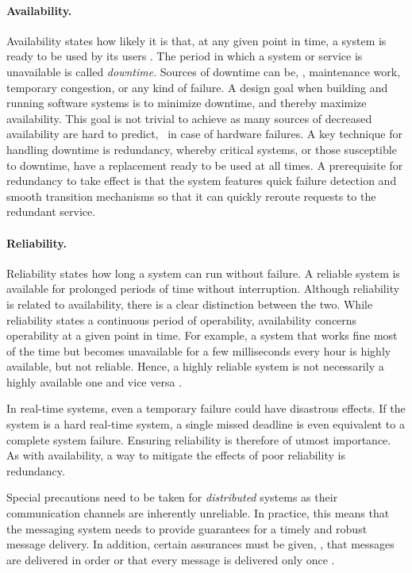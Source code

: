 \paragraph{Availability.}
Availability states how likely it is that, at any given point in time, a system is ready to be used by its users \cite{tanenbaum2017distributed}. The period in which a system or service is unavailable is called \emph{downtime}. Sources of downtime can be, \eg , maintenance work, temporary congestion, or any kind of failure. A design goal when building and running software systems is to minimize downtime, and thereby maximize availability. This goal is not trivial to achieve as many sources of decreased availability are hard to predict, \eg\ in case of hardware failures. A key technique for handling downtime is redundancy, whereby critical systems, or those susceptible to downtime, have a replacement ready to be used at all times. A prerequisite for redundancy to take effect is that the system features quick failure detection and smooth transition mechanisms so that it can quickly reroute requests to the redundant service.

\paragraph{Reliability.}
Reliability states how long a system can run without failure. A reliable system is available for prolonged periods of time without interruption. Although reliability is related to availability, there is a clear distinction between the two. While reliability states a continuous period of operability, availability concerns operability at a given point in time. For example, a system that works fine most of the time but becomes unavailable for a few milliseconds every hour is highly available, but not reliable. Hence, a highly reliable system is not necessarily a highly available one and vice versa \cite{tanenbaum2017distributed}.

In real-time systems, even a temporary failure could have disastrous effects. If the system is a hard real-time system, a single missed deadline is even equivalent to a complete system failure. Ensuring reliability is therefore of utmost importance. As with availability, a way to mitigate the effects of poor reliability is redundancy.

Special precautions need to be taken for \emph{distributed} systems as their communication channels are inherently unreliable. In practice, this means that the messaging system needs to provide guarantees for a timely and robust message delivery. In addition, certain assurances must be given, \eg , that messages are delivered in order or that every message is delivered only once \cite{o2007quality}. 

